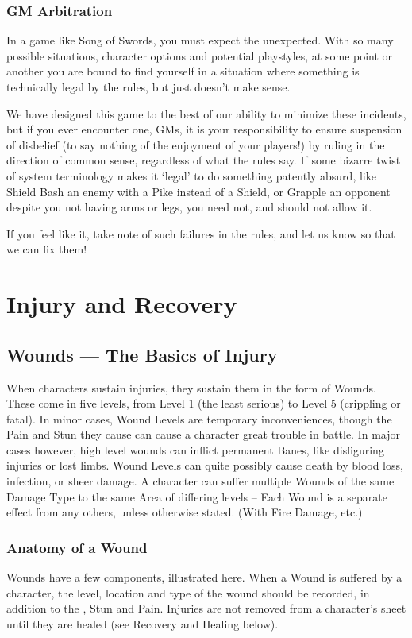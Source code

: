 \documentclass[oneside,11pt,english]{book}
\begin{document}
\subsection*{GM Arbitration}
In a game like Song of Swords, you must expect the unexpected. With so many
possible situations, character options and potential playstyles, at some point
or another you are bound to find yourself in a situation where something is
technically legal by the rules, but just doesn’t make sense.

We have designed this game to the best of our ability to minimize these
incidents, but if you ever encounter one, GMs, it is your responsibility to
ensure suspension of disbelief (to say nothing of the enjoyment of your
players!) by ruling in the direction of common sense, regardless of what the
rules say. If some bizarre twist of system terminology makes it ‘legal’ to do
something patently absurd, like Shield Bash an enemy with a Pike instead of a
Shield, or Grapple an opponent despite you not having arms or legs, you need
not, and should not allow it.

If you feel like it, take note of such failures in the rules, and let us know so
that we can fix them!
\chapter{Injury and Recovery}\label{ch:injuryrecovery}
\startcontents[chapters]
\clearpage
\section{Wounds --- The Basics of Injury}
When characters sustain injuries, they sustain them in the form of Wounds. These
come in five levels, from Level 1 (the least serious) to Level 5 (crippling or
fatal). In minor cases, Wound Levels are temporary inconveniences, though the
Pain and Stun they cause can cause a character great trouble in battle. In major
cases however, high level wounds can inflict permanent Banes, like disfiguring
injuries or lost limbs. Wound Levels can quite possibly cause death by blood
loss, infection, or sheer damage. A character can suffer multiple Wounds of the
same Damage Type to the same Area of differing levels -- Each Wound is a
separate effect from any others, unless otherwise stated. (With Fire Damage,
etc.)

\subsection{Anatomy of a Wound}
Wounds have a few components, illustrated here. When a Wound is suffered by a character, the level, location and type of the wound should be recorded, in addition to the , Stun and Pain. 
Injuries are not removed from a character’s sheet until they are healed (see Recovery and Healing below).
\end{document}
